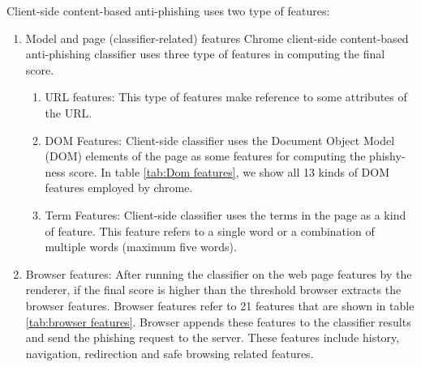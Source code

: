 Client-side content-based anti-phishing uses two type of features:
\begin{enumerate}
\item Model and page (classifier-related) features Chrome client-side content-based anti-phishing classifier uses three type of features in computing the final score.
    \begin{enumerate}
    \item URL features: This type of features make reference to some attributes of the URL.
    \item DOM Features: Client-side classifier uses the Document Object Model (DOM) elements of the page as some features for computing the phishy-ness score. In table \ref{tab:Dom features}, we show all 13 kinds of DOM features employed by chrome.
    \item Term Features: Client-side classifier uses the terms in the page as a kind of feature. This feature refers to a single word or a combination of multiple words (maximum five words).
\end{enumerate}
\item Browser features: After running the classifier on the web page features by the renderer, if the final score is higher than the threshold browser extracts the browser features. Browser features refer to 21 features that are shown in table \ref{tab:browser features}. Browser appends these features to the classifier results and send the phishing request to the server. These features include history, navigation, redirection and safe browsing related features.
    
\end{enumerate}





